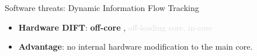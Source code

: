 \begin{frame}{Software threats: Dynamic Information Flow Tracking}
    \begin{minipage}[c]{0.45\textwidth}
        \begin{block}{}
            \begin{itemize}
                [square]
                \justifying
                    \item \textbf{Hardware DIFT}: \textbf{off-core} \cite{KDK-09-dsn}, \textcolor{Gainsboro}{off-loading core, in-core}
            \end{itemize}
        \end{block}
        
        \begin{exampleblock}{}
            \begin{itemize}
                [square]
                \justifying
                \item \textbf{Advantage}: no internal hardware modification to the main core.
            \end{itemize}
        \end{exampleblock}
        

\end{minipage}
\end{frame}
